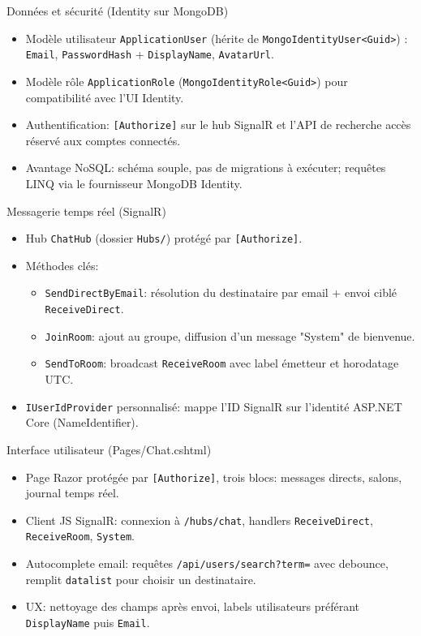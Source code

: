 \documentclass[10pt]{beamer}
\begin{document}
\begin{frame}{Données et sécurité (Identity sur MongoDB)}
  \begin{itemize}
    \item Modèle utilisateur \texttt{ApplicationUser} (hérite de \texttt{MongoIdentityUser<Guid>}) : \texttt{Email}, \texttt{PasswordHash} + \texttt{DisplayName}, \texttt{AvatarUrl}.
    \item Modèle rôle \texttt{ApplicationRole} (\texttt{MongoIdentityRole<Guid>}) pour compatibilité avec l'UI Identity.
    \item Authentification: \texttt{[Authorize]} sur le hub SignalR et l'API de recherche \Rightarrow accès réservé aux comptes connectés.
    \item Avantage NoSQL: schéma souple, pas de migrations à exécuter; requêtes LINQ via le fournisseur MongoDB Identity.
  \end{itemize}
\end{frame}

\begin{frame}{Messagerie temps réel (SignalR)}
  \begin{itemize}
    \item Hub \texttt{ChatHub} (dossier \texttt{Hubs/}) protégé par \texttt{[Authorize]}.
    \item Méthodes clés:
      \begin{itemize}
        \item \texttt{SendDirectByEmail}: résolution du destinataire par email + envoi ciblé \texttt{ReceiveDirect}.
        \item \texttt{JoinRoom}: ajout au groupe, diffusion d'un message "System" de bienvenue.
        \item \texttt{SendToRoom}: broadcast \texttt{ReceiveRoom} avec label émetteur et horodatage UTC.
      \end{itemize}
    \item \texttt{IUserIdProvider} personnalisé: mappe l'ID SignalR sur l'identité ASP.NET Core (NameIdentifier).
  \end{itemize}
\end{frame}

\begin{frame}{Interface utilisateur (Pages/Chat.cshtml)}
  \begin{itemize}
    \item Page Razor protégée par \texttt{[Authorize]}, trois blocs: messages directs, salons, journal temps réel.
    \item Client JS SignalR: connexion à \texttt{/hubs/chat}, handlers \texttt{ReceiveDirect}, \texttt{ReceiveRoom}, \texttt{System}.
    \item Autocomplete email: requêtes \texttt{/api/users/search?term=} avec debounce, remplit \texttt{datalist} pour choisir un destinataire.
    \item UX: nettoyage des champs après envoi, labels utilisateurs préférant \texttt{DisplayName} puis \texttt{Email}.
  \end{itemize}
\end{frame}
\end{document}
